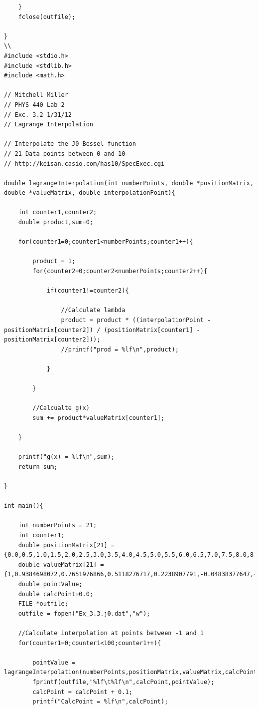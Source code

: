 \documentclass[12pt]{article}
\begin{document}
\begin{verbatim}
	}
	fclose(outfile);

}
\\
#include <stdio.h>
#include <stdlib.h>
#include <math.h>

// Mitchell Miller
// PHYS 440 Lab 2
// Exc. 3.2 1/31/12
// Lagrange Interpolation

// Interpolate the J0 Bessel function
// 21 Data points between 0 and 10
// http://keisan.casio.com/has10/SpecExec.cgi

double lagrangeInterpolation(int numberPoints, double *positionMatrix, double *valueMatrix, double interpolationPoint){

	int counter1,counter2;
	double product,sum=0;

	for(counter1=0;counter1<numberPoints;counter1++){

		product = 1;
		for(counter2=0;counter2<numberPoints;counter2++){

			if(counter1!=counter2){

				//Calculate lambda
				product = product * ((interpolationPoint - positionMatrix[counter2]) / (positionMatrix[counter1] - positionMatrix[counter2]));
				//printf("prod = %lf\n",product);

			}
			
		}

		//Calcualte g(x)
		sum += product*valueMatrix[counter1];

	}

	printf("g(x) = %lf\n",sum);
	return sum;

}

int main(){

	int numberPoints = 21;
	int counter1;
	double positionMatrix[21] = {0.0,0.5,1.0,1.5,2.0,2.5,3.0,3.5,4.0,4.5,5.0,5.5,6.0,6.5,7.0,7.5,8.0,8.5,9.0,9.5,10.0};
	double valueMatrix[21] = {1,0.9384698072,0.7651976866,0.5118276717,0.2238907791,-0.04838377647,-0.2600519549,-0.38012774,-0.3971498099,-0.320542509,-0.1775967713,-0.0068438694,0.1506452573,0.260094606,0.3000792705,0.2663396579,0.1716508071,0.0419392518,-0.0903336112,-0.1939287477,-0.2459357645};
	double pointValue;
	double calcPoint=0.0;
	FILE *outfile;
	outfile = fopen("Ex_3.3.j0.dat","w");

	//Calculate interpolation at points between -1 and 1
	for(counter1=0;counter1<100;counter1++){
		
		pointValue = lagrangeInterpolation(numberPoints,positionMatrix,valueMatrix,calcPoint);
		fprintf(outfile,"%lf\t%lf\n",calcPoint,pointValue);
		calcPoint = calcPoint + 0.1;
		printf("CalcPoint = %lf\n",calcPoint);


\end{verbatim}
\end{document}
